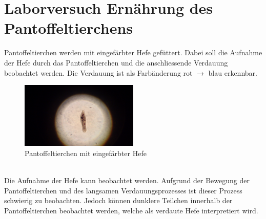 \section{Laborversuch Ernährung des Pantoffeltierchens}
Pantoffeltierchen werden mit eingefärbter Hefe gefüttert. 
Dabei soll die Aufnahme der Hefe durch das Pantoffeltierchen und die 
anschliessende Verdauung beobachtet werden. Die Verdauung ist als Farbänderung 
rot $\to$ blau erkennbar. 
\begin{figure}[h!]
    \centering
    \includegraphics[width=0.5\textwidth]{fig/paramecium/DSC_1818.jpg}
    \caption{Pantoffeltierchen mit eingefärbter Hefe}
    \label{fig:paramecium}
\end{figure}\\
Die Aufnahme der Hefe kann beobachtet werden. 
Aufgrund der Bewegung der Pantoffeltierchen und des langsamen 
Verdauungsprozesses ist dieser Prozess schwierig zu beobachten. 
Jedoch können dunklere Teilchen innerhalb der Pantoffeltierchen 
beobachtet werden, welche als verdaute Hefe interpretiert wird. 
